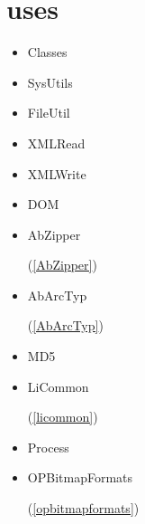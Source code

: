 \documentclass{report}
\begin{document}
\section{uses}
\begin{itemize}
\item \begin{ttfamily}Classes\end{ttfamily}\item \begin{ttfamily}SysUtils\end{ttfamily}\item \begin{ttfamily}FileUtil\end{ttfamily}\item \begin{ttfamily}XMLRead\end{ttfamily}\item \begin{ttfamily}XMLWrite\end{ttfamily}\item \begin{ttfamily}DOM\end{ttfamily}\item \begin{ttfamily}AbZipper\end{ttfamily}(\ref{AbZipper})\item \begin{ttfamily}AbArcTyp\end{ttfamily}(\ref{AbArcTyp})\item \begin{ttfamily}MD5\end{ttfamily}\item \begin{ttfamily}LiCommon\end{ttfamily}(\ref{licommon})\item \begin{ttfamily}Process\end{ttfamily}\item \begin{ttfamily}OPBitmapFormats\end{ttfamily}(\ref{opbitmapformats})\end{itemize}
\end{document}
